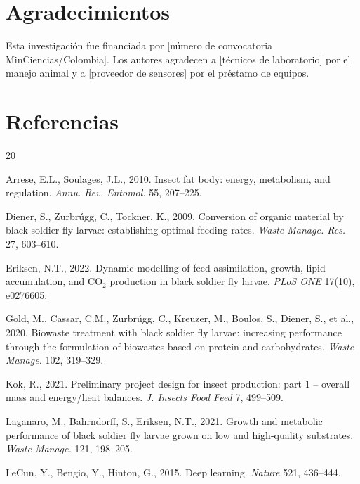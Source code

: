 \documentclass[12pt,a4paper]{article}
\begin{document}
\section*{Agradecimientos}

Esta investigaci\'{o}n fue financiada por [n\'{u}mero de convocatoria MinCiencias/Colombia]. Los autores agradecen a [t\'{e}cnicos de laboratorio] por el manejo animal y a [proveedor de sensores] por el pr\'{e}stamo de equipos.

\section*{Referencias}

\begin{thebibliography}{20}

Arrese, E.L., Soulages, J.L., 2010. Insect fat body: energy, metabolism, and regulation. \textit{Annu. Rev. Entomol.} 55, 207--225.

Diener, S., Zurbr\'{u}gg, C., Tockner, K., 2009. Conversion of organic material by black soldier fly larvae: establishing optimal feeding rates. \textit{Waste Manage. Res.} 27, 603--610.

Eriksen, N.T., 2022. Dynamic modelling of feed assimilation, growth, lipid accumulation, and CO$_2$ production in black soldier fly larvae. \textit{PLoS ONE} 17(10), e0276605.

Gold, M., Cassar, C.M., Zurbr\'{u}gg, C., Kreuzer, M., Boulos, S., Diener, S., et al., 2020. Biowaste treatment with black soldier fly larvae: increasing performance through the formulation of biowastes based on protein and carbohydrates. \textit{Waste Manage.} 102, 319--329.

Kok, R., 2021. Preliminary project design for insect production: part 1 -- overall mass and energy/heat balances. \textit{J. Insects Food Feed} 7, 499--509.

Laganaro, M., Bahrndorff, S., Eriksen, N.T., 2021. Growth and metabolic performance of black soldier fly larvae grown on low and high-quality substrates. \textit{Waste Manage.} 121, 198--205.

LeCun, Y., Bengio, Y., Hinton, G., 2015. Deep learning. \textit{Nature} 521, 436--444.


\end{thebibliography}
\end{document}
